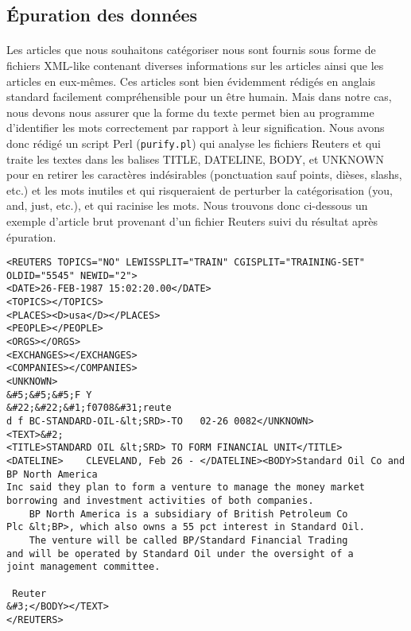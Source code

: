 \subsection{Épuration des données}

\paragraph{}
Les articles que nous souhaitons catégoriser nous sont fournis sous forme de fichiers XML-like contenant diverses informations sur les articles ainsi que les articles en eux-mêmes. Ces articles sont bien évidemment rédigés en anglais standard facilement compréhensible pour un être humain. Mais dans notre cas, nous devons nous assurer que la forme du texte permet bien au programme d'identifier les mots correctement par rapport à leur signification. Nous avons donc rédigé un script Perl (\texttt{purify.pl}) qui analyse les fichiers Reuters et qui traite les textes dans les balises TITLE, DATELINE, BODY, et UNKNOWN pour en retirer les caractères indésirables (ponctuation sauf points, dièses, slashs, etc.) et les mots inutiles et qui risqueraient de perturber la catégorisation (you, and, just, etc.), et qui racinise les mots. Nous trouvons donc ci-dessous un exemple d'article brut provenant d'un fichier Reuters suivi du résultat après épuration.

\lstset{language=XML}
\begin{lstlisting}
<REUTERS TOPICS="NO" LEWISSPLIT="TRAIN" CGISPLIT="TRAINING-SET" OLDID="5545" NEWID="2">
<DATE>26-FEB-1987 15:02:20.00</DATE>
<TOPICS></TOPICS>
<PLACES><D>usa</D></PLACES>
<PEOPLE></PEOPLE>
<ORGS></ORGS>
<EXCHANGES></EXCHANGES>
<COMPANIES></COMPANIES>
<UNKNOWN> 
&#5;&#5;&#5;F Y
&#22;&#22;&#1;f0708&#31;reute
d f BC-STANDARD-OIL-&lt;SRD>-TO   02-26 0082</UNKNOWN>
<TEXT>&#2;
<TITLE>STANDARD OIL &lt;SRD> TO FORM FINANCIAL UNIT</TITLE>
<DATELINE>    CLEVELAND, Feb 26 - </DATELINE><BODY>Standard Oil Co and BP North America
Inc said they plan to form a venture to manage the money market
borrowing and investment activities of both companies.
    BP North America is a subsidiary of British Petroleum Co
Plc &lt;BP>, which also owns a 55 pct interest in Standard Oil.
    The venture will be called BP/Standard Financial Trading
and will be operated by Standard Oil under the oversight of a
joint management committee.

 Reuter
&#3;</BODY></TEXT>
</REUTERS>
\end{lstlisting}

